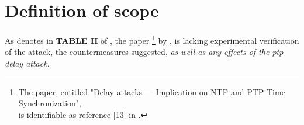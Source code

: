 \section{Definition of scope}



As \citeauthor{moussa2016security}denotes in \textbf{TABLE II} of \cite[p. 1959]{moussa2016security}, the paper \cite{ullmann2009delay}\footnote{ The paper, entitled "Delay attacks — Implication on NTP and PTP Time Synchronization",\\ is  identifiable as reference [13] in \cite{moussa2016security}.} by \citeauthor{ullmann2009delay}, is lacking experimental verification of the attack, the countermeasures  
suggested, \textit{as well as any effects of the \acrshort{ptp} delay attack}. 

